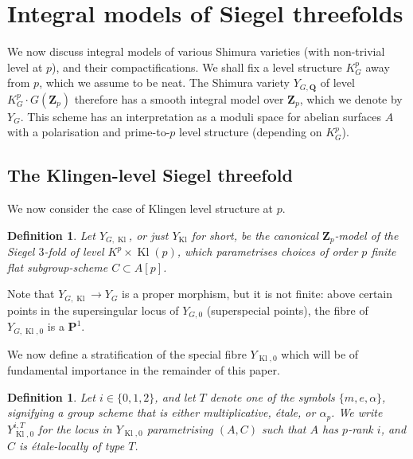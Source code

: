 \documentclass[cjm]{ipart}
\theoremstyle{plain}
\newtheorem{definition}[theorem]{Definition}
\theoremstyle{remark}
\DeclareMathOperator{\Kl}{Kl}
\newcommand{\QQ}{\mathbf{Q}}
\newcommand{\Zp}{\mathbf{Z}_p}
\numberwithin{equation}{subsection}
\begin{document}


\section{Integral models of Siegel threefolds}
 \label{sect:intmodels}

 We now discuss integral models of various Shimura varieties (with non-trivial level at $p$), and their compactifications. We shall fix a level structure $K^p_G$ away from $p$, which we assume to be neat. The Shimura variety $Y_{G, \QQ}$ of level $K^p_G \cdot G(\Zp)$ therefore has a smooth integral model over $\Zp$, which we denote by $Y_G$. This scheme has an interpretation as a moduli space for abelian surfaces $A$ with a polarisation and prime-to-$p$ level structure (depending on $K^p_G$).

 \subsection{The Klingen-level Siegel threefold}

  We now consider the case of Klingen level structure at $p$.

  \begin{definition}
   Let $Y_{G,\Kl}$, or just $Y_{\Kl}$ for short, be the canonical $\Zp$-model of the Siegel $3$-fold of level $K^{p} \times \Kl(p)$, which parametrises choices of order $p$ finite flat subgroup-scheme $C \subset A[p]$.
  \end{definition}

  \begin{remark}
   Note that $Y_{G, \Kl} \to Y_G$ is a proper morphism, but it is not finite: above certain points in the supersingular locus of $Y_{G, 0}$ (superspecial points), the fibre of $Y_{G, \Kl,0}$ is a $\mathbf{P}^1$.
  \end{remark}

  We now define a stratification of the special fibre $Y_{\Kl, 0}$ which will be of fundamental importance in the remainder of this paper.

  \begin{definition}
   Let $i \in \{0, 1, 2\}$, and let $T$ denote one of the symbols $\{ m, e, \alpha\}$, signifying a group scheme that is either multiplicative, \'etale, or $\alpha_p$. We write $Y_{\Kl, 0}^{i, T}$ for the locus in $Y_{\Kl, 0}$ parametrising $(A, C)$ such that $A$ has $p$-rank $i$, and $C$ is \'etale-locally of type $T$.
  \end{definition}
\end{document}
